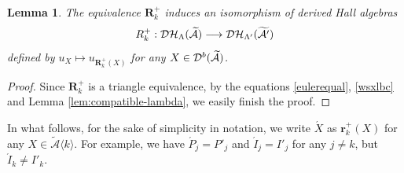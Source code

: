 \documentclass[reqno,12pt]{amsart}
\numberwithin{equation}{section}
\theoremstyle{plain} %
\newtheorem{lemma}[theorem]{\bf Lemma}
\theoremstyle{definition} %
\begin{document}
\begin{lemma}\label{lem:iso-dervied-hall-algebra-reflection}
The equivalence $\mathbf{R}_k^+$ induces an isomorphism of derived Hall algebras
\[R_k^+: \mathcal{DH}_\Lambda(\widetilde{\mathcal{A}})\longrightarrow\mathcal{DH}_{\Lambda'}(\widetilde{\mathcal{A}'})\] defined by $u_X\mapsto u_{\mathbf{R}_k^+(X)}$ for any $X\in \mathcal{D}^b(\widetilde{\mathcal{A}})$.
\end{lemma}
\begin{proof}
Since $\mathbf{R}_k^+$ is a triangle equivalence, by the equations \eqref{eulerequal}, \eqref{wsxlbc} and Lemma \ref{lem:compatible-lambda}, we easily finish the proof.
\end{proof}
In what follows, for the sake of simplicity in notation, we write $\acute{X}$ as $\mathbf{r}_k^+(X)$ for any $X\in\widetilde{\mathcal{A}}\langle k\rangle$. For example, we have $\acute{P}_j=P'_j$ and $\acute{I}_j=I'_j$ for any $j\neq k$, but $\acute{I}_k\neq I'_k$.
\end{document}
